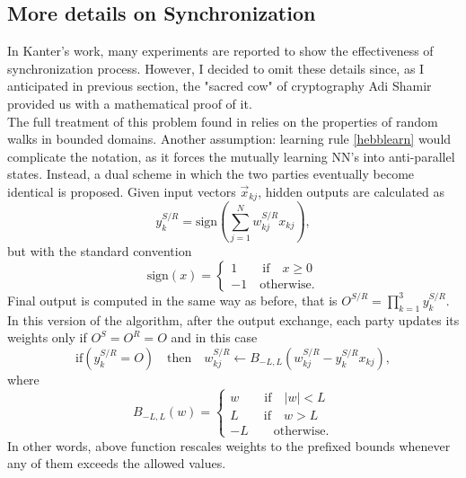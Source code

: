 \documentclass[%
    corpo=11pt,
    twoside,
    stile=classica,
    oldstyle,
    autoretitolo,
    tipotesi=magistrale,
    greek,
    evenboxes,
    english
]{toptesi}
\newcommand{\sign}{\text{sign}}
\begin{document}
\subsection{More details on Synchronization}
\label{ssc:synchro}
In Kanter's work, many experiments are reported to show the effectiveness of synchronization process. However, I decided to omit these details since, as I anticipated in previous section, the "sacred cow" of cryptography Adi Shamir provided us with a mathematical proof of it. \\
The full treatment of this problem found in \cite{shamir} relies on the properties of random walks in bounded domains. Another assumption: learning rule \eqref{hebblearn} would complicate the notation, as it forces the mutually learning NN's into anti-parallel states. Instead, a dual scheme in which the two parties eventually become identical is proposed. Given input vectors $\vec{x}_{kj}$, hidden outputs are calculated as
\begin{equation}
y_k^{S/R} = \sign\left(\sum_{j=1}^{N}w_{kj}^{S/R}x_{kj}\right),
\end{equation}
but with the standard convention 
\begin{equation}
\sign(x) = \begin{cases}
1 \qquad \text{if} \quad x \geq 0 \\
-1 \quad \text{otherwise.}
\end{cases}
\end{equation}
Final output is computed in the same way as before, that is $O^{S/R} = \prod_{k=1}^{3}y_k^{S/R}$. In this version of the algorithm, after the output exchange, each party updates its weights only if $O^S=O^R=O$ and in this case 
\begin{equation}
\label{shamirlearn}
\text{if} \left(y_k^{S/R}=O\right) \quad \text{then} \quad 
w_{kj}^{S/R} \leftarrow B_{-L,L}\left(w_{kj}^{S/R} - y_k^{S/R}x_{kj}\right),
\end{equation}
where
\begin{equation}
\label{rebound}
B_{-L,L}(w) = \begin{cases}
w \qquad \text{if} \quad |w|<L \\
L \qquad \text{if} \quad w>L \\
-L \qquad \text{otherwise}.
\end{cases}
\end{equation}
In other words, above function rescales weights to the prefixed bounds whenever any of them exceeds the allowed values. \\
\end{document}
